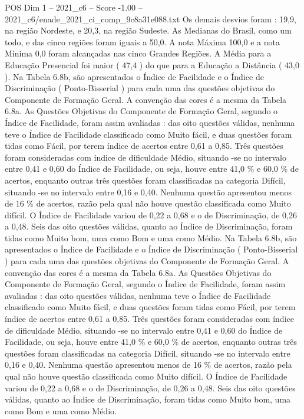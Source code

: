 \begin{textsample}{POS Dim 1 – 2021\_c6 – Score -1.00 – 2021\_c6/enade\_2021\_ci\_comp\_9c8a31e088.txt}
Os demais desvios foram : 19,9, na região Nordeste, e 20,3, na região Sudeste.
As Medianas do Brasil, como um todo, e das cinco regiões foram iguais a 50,0.
A nota Máxima 100,0 e a nota Mínima 0,0 foram alcançadas nas cinco Grandes Regiões.
A Média para a Educação Presencial foi maior ( 47,4 ) do que para a Educação a Distância ( 43,0 ).
Na Tabela 6.8b, são apresentados o Índice de Facilidade e o Índice de Discriminação ( Ponto-Bisserial ) para cada uma das questões objetivas do Componente de Formação Geral.
A convenção das cores é a mesma da Tabela 6.8a.
As Questões Objetivas do Componente de Formação Geral, segundo o Índice de Facilidade, foram assim avaliadas : das oito questões válidas, nenhuma teve o Índice de Facilidade classificado como Muito fácil, e duas questões foram tidas como Fácil, por terem índice de acertos entre 0,61 a 0,85.
Três questões foram consideradas com índice de dificuldade Médio, situando -se no intervalo entre 0,41 e 0,60 do Índice de Facilidade, ou seja, houve entre 41,0 \% e 60,0 \% de acertos, enquanto outras três questões foram classificadas na categoria Difícil, situando -se no intervalo entre 0,16 e 0,40.
Nenhuma questão apresentou menos de 16 \% de acertos, razão pela qual não houve questão classificada como Muito difícil.
O Índice de Facilidade variou de 0,22 a 0,68 e o de Discriminação, de 0,26 a 0,48.
Seis das oito questões válidas, quanto ao Índice de Discriminação, foram tidas como Muito bom, uma como Bom e uma como Médio.
Na Tabela 6.8b, são apresentados o Índice de Facilidade e o Índice de Discriminação ( Ponto-Bisserial ) para cada uma das questões objetivas do Componente de Formação Geral.
A convenção das cores é a mesma da Tabela 6.8a.
As Questões Objetivas do Componente de Formação Geral, segundo o Índice de Facilidade, foram assim avaliadas : das oito questões válidas, nenhuma teve o Índice de Facilidade classificado como Muito fácil, e duas questões foram tidas como Fácil, por terem índice de acertos entre 0,61 a 0,85.
Três questões foram consideradas com índice de dificuldade Médio, situando -se no intervalo entre 0,41 e 0,60 do Índice de Facilidade, ou seja, houve entre 41,0 \% e 60,0 \% de acertos, enquanto outras três questões foram classificadas na categoria Difícil, situando -se no intervalo entre 0,16 e 0,40.
Nenhuma questão apresentou menos de 16 \% de acertos, razão pela qual não houve questão classificada como Muito difícil.
O Índice de Facilidade variou de 0,22 a 0,68 e o de Discriminação, de 0,26 a 0,48.
Seis das oito questões válidas, quanto ao Índice de Discriminação, foram tidas como Muito bom, uma como Bom e uma como Médio.

\end{textsample}
